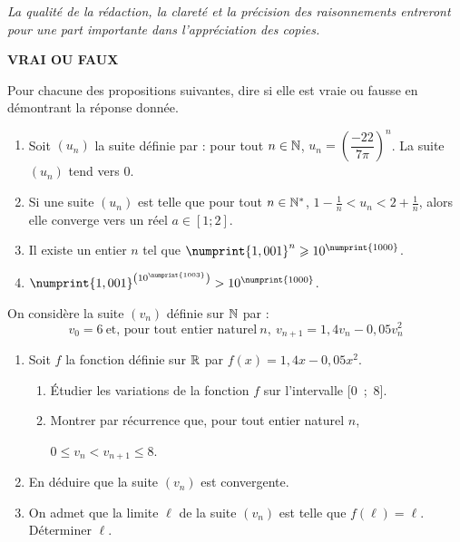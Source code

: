 \documentclass[a4paper,11pt,DIV12,BCOR0mm]{scrartcl}
\begin{document}
\emph{La qualité de la rédaction, la clareté et la précision des raisonnements 
entreront pour une part importante dans l'appréciation des copies.}
\medskip


\begin{exercice}
 \textbf{VRAI OU FAUX}
 
Pour chacune des propositions suivantes, dire si elle est vraie ou fausse en démontrant la réponse donnée.


\medskip 

 
\begin{enumerate}
\item Soit $(u_n)$ la suite définie par : pour tout $n\in\mathbb{N}$, $u_n=\left(\dfrac{-22}{7\pi}\right)^n$. La suite $(u_n)$
tend vers 0. 
\item Si une suite $(u_n)$ est telle que pour tout 
$n\in\mathbb{N}^*$, $1-\frac1n\less u_n \less 2+\frac1n$, alors elle converge vers un réel $a\in[1;2]$. 
\item Il existe un entier $n$ tel que $\numprint{1,001}^n\more 10^{\numprint{1000}}$.
\item  $\numprint{1,001}^{\left(10^{\numprint{1003}}\right)}> 10^{\numprint{1000}}$.
\end{enumerate}

\end{exercice}

\begin{exercice}
 On considère la suite $\left(v_{n}\right)$ définie sur $\mathbb{N}$ par :
\[v_{0} =  6~ \text{et, pour tout entier naturel}~ n,~v_{n+1} =  1,4v_{n} - 0,05v_{n}^2\]

\begin{enumerate}
\item  Soit $f$ la fonction définie sur $\mathbb{R}$ par $f(x) = 1,4x - 0,05x^2$.
	\begin{enumerate}
		\item  Étudier les variations de la fonction $f$ sur l'intervalle [0~;~8].
		\item  Montrer par récurrence que, pour tout entier naturel $n$,
		
 $0 \leqslant  v_{n} < v_{n+1} \leqslant  8$.
	\end{enumerate}

\item En déduire que la suite $\left(v_{n}\right)$ est convergente.
\item On admet que la limite $\ell$ de la suite $(v_n)$ est telle que $f(\ell)=\ell$.
Déterminer $\ell$.
\end{enumerate}
\end{exercice}
\end{document}
